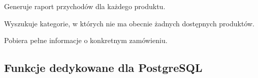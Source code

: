 \documentclass[letterpaper,10pt,polish]{sphinxmanual}
\begin{document}
\begin{fulllineitems}
\label{\detokenize{rozdzia_u0142_5/BD_Zapytania/index:id2}}
\pysigstartsignatures
{}
\pysigstopsignatures
\sphinxAtStartPar
Generuje raport przychodów dla każdego produktu.

\end{fulllineitems}


\begin{fulllineitems}
\label{\detokenize{rozdzia_u0142_5/BD_Zapytania/index:id3}}
\pysigstartsignatures
{}
\pysigstopsignatures
\sphinxAtStartPar
Wyszukuje kategorie, w których nie ma obecnie żadnych dostępnych produktów.

\end{fulllineitems}


\begin{fulllineitems}
\label{\detokenize{rozdzia_u0142_5/BD_Zapytania/index:id4}}
\pysigstartsignatures
{}
\pysigstopsignatures
\sphinxAtStartPar
Pobiera pełne informacje o konkretnym zamówieniu.

\end{fulllineitems}



\subsection{Funkcje dedykowane dla PostgreSQL}
\label{\detokenize{rozdzia_u0142_5/BD_Zapytania/index:funkcje-dedykowane-dla-postgresql}}
\end{document}
